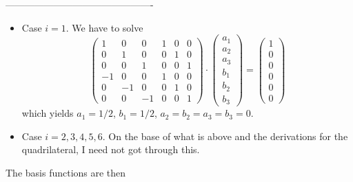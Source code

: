 ----------------------------------------------

\begin{itemize}
\item Case $i=1$. We have to solve
\[
\left(\begin{array}{cccccc}
1 & 0 & 0 & 1 & 0 & 0 \\
0 & 1 & 0 & 0 & 1 & 0 \\
0 & 0 & 1 & 0 & 0 & 1 \\
-1 & 0 & 0 & 1 & 0 & 0 \\
0 & -1 & 0 & 0 & 1 & 0 \\
0 & 0 & -1 & 0 & 0 & 1 
\end{array}\right)
\cdot
\left(\begin{array}{c}
a_1 \\ a_2 \\ a_3 \\ b_1 \\ b_2 \\ b_3
\end{array}\right)
=
\left(\begin{array}{c}
1 \\ 0 \\ 0 \\ 0 \\ 0 \\ 0
\end{array}\right)
\]
which yields
$a_1=1/2$, $b_1=1/2$, $a_2=b_2=a_3=b_3=0$.

\item Case $i=2,3,4,5,6$. On the base of what is above and the derivations for the 
quadrilateral, I need not got through this.

\end{itemize}

The basis functions are then

